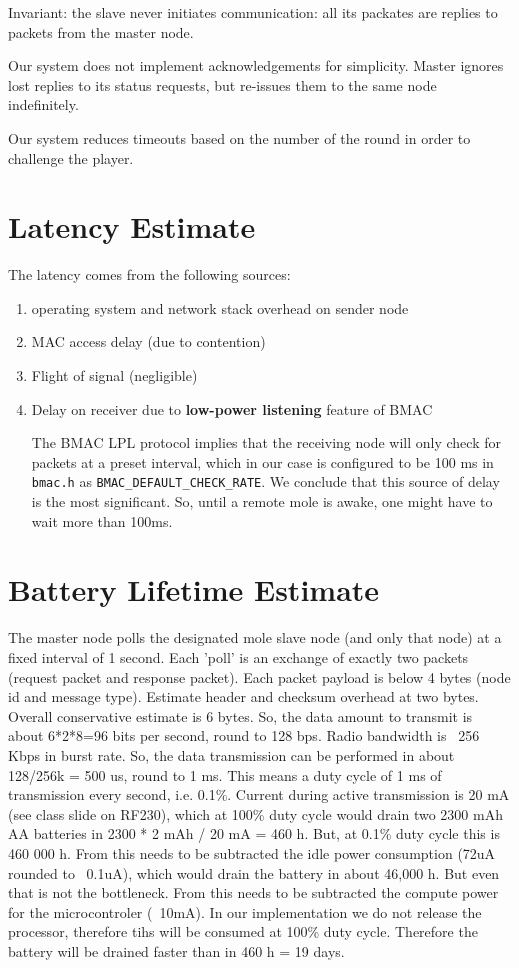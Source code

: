 \documentclass{article}
\begin{document}
Invariant: the slave never initiates communication: all its packates are replies
to packets from the master node.

Our system does not implement acknowledgements for simplicity.
Master ignores lost replies to its status requests, but
re-issues them to the same node indefinitely.

Our system reduces timeouts based on the number of the round
in order to challenge the player.

\section*{Latency Estimate}

The latency comes from the following sources:
\begin{enumerate}
\item operating system and network stack overhead on sender node
\item MAC access delay (due to contention)
\item Flight of signal (negligible)
\item Delay on receiver due to \textbf{low-power listening} feature of BMAC

The BMAC LPL protocol implies that the receiving node will only check for
packets at a preset interval, which in our case is configured to be 100 ms in
\texttt{bmac.h} as \verb!BMAC_DEFAULT_CHECK_RATE!. We conclude that this source
of delay is the most significant.  So, until a remote mole is awake, one might
have to wait more than 100ms.
\end{enumerate}

\section*{Battery Lifetime Estimate}

The master node polls the designated mole slave node (and only that node)
at a fixed interval of 1 second. Each 'poll' is an exchange of exactly
two packets (request packet and response packet). Each packet payload is below
4 bytes (node id and message type). Estimate header and checksum overhead
at two bytes. Overall conservative  estimate is 6 bytes. So, the data
amount to transmit is about 6*2*8=96 bits per second, round to 128 bps.
Radio bandwidth is ~256 Kbps in burst rate. So, the data transmission
can be performed in about 128/256k = 500 us, round to 1 ms. This means
a duty cycle of 1 ms of transmission every second, i.e. 0.1\%. Current during
active transmission is 20 mA (see class slide on RF230), which at 100\% duty
cycle would drain two 2300 mAh AA batteries in 2300 * 2 mAh / 20 mA = 460 h.
But, at 0.1\% duty cycle this is 460 000 h. From this needs to be
subtracted the idle power consumption (72uA rounded to ~0.1uA), which
would drain the battery in about 46,000 h. But even that is not the
bottleneck.  From this needs to be subtracted the compute power for the
microcontroler (~10mA). In our implementation we do not release the processor,
therefore tihs will be consumed at 100\% duty cycle. Therefore the battery
will be drained faster than in 460 h = 19 days.
\end{document}
